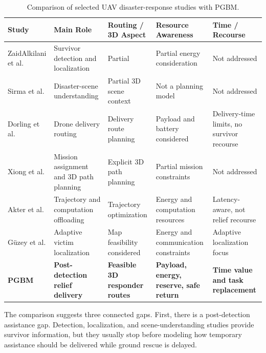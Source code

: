 \begin{table}[htbp]
\centering
\caption{Comparison of selected UAV disaster-response studies with PGBM.}
\label{tab:related_summary}
\footnotesize
\renewcommand{\arraystretch}{1.15}
\begin{tabularx}{\textwidth}{
    >{\raggedright\arraybackslash}p{2.8cm}
    >{\raggedright\arraybackslash}p{2.5cm}
    >{\raggedright\arraybackslash}p{2.5cm}
    >{\raggedright\arraybackslash}p{3.0cm}
    >{\centering\arraybackslash}X}
\toprule
\textbf{Study} &
\textbf{Main Role} &
\textbf{Routing / 3D Aspect} &
\textbf{Resource Awareness} &
\textbf{Time / Recourse} \\
\midrule
ZaidAlkilani et al. \cite{zaidalkilani2026aiuav}
& Survivor detection and localization
& Partial
& Partial energy consideration
& Not addressed\\
\midrule
Sirma et al. \cite{sirma2025drespnet}
& Disaster-scene understanding
& Partial 3D scene context
& Not a planning model
& Not addressed\\
\midrule
Dorling et al. \cite{dorling2017dronevrp}
& Drone delivery routing
& Delivery route planning
& Payload and battery considered
& Delivery-time limits, no survivor recourse\\
\midrule
Xiong et al. \cite{xiong2023multidrone}
& Mission assignment and 3D path planning
& Explicit 3D path planning
& Partial mission constraints
& Not addressed\\
\midrule
Akter et al. \cite{akter2025joint}
& Trajectory and computation offloading
& Trajectory optimization
& Energy and computation resources
& Latency-aware, not relief recourse\\
\midrule
G\"uzey et al. \cite{guzey2026fedqmix}
& Adaptive victim localization
& Map feasibility considered
& Energy and communication constraints
& Adaptive localization focus\\
\midrule
\textbf{PGBM}
& \textbf{Post-detection relief delivery}
& \textbf{Feasible 3D responder routes}
& \textbf{Payload, energy, reserve, safe return}
& \textbf{Time value and task replacement}\\
\bottomrule
\end{tabularx}
\end{table}

The comparison suggests three connected gaps. First, there is a post-detection
assistance gap. Detection, localization, and scene-understanding studies
provide survivor information, but they usually stop before modeling how
temporary assistance should be delivered while ground rescue is delayed.

